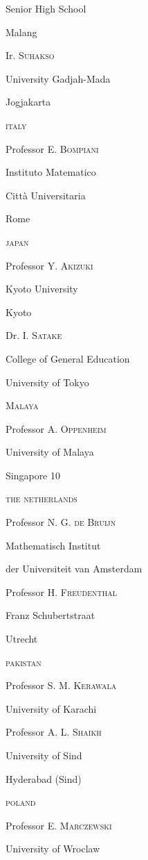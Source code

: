 \quad Senior High School

\quad Malang
\smallskip

\quad Ir. \textsc{Suhakso}

\quad University Gadjah-Mada

\quad Jogjakarta
\medskip

\noindent
\textsc{italy}

\quad Professor \textsc{E. Bompiani}

\quad Instituto Matematico

\quad Citt\`a Universitaria

\quad Rome
\medskip

\noindent
\textsc{japan}

\quad Professor \textsc{Y. Akizuki}

\quad Kyoto University

\quad Kyoto
\smallskip

\quad Dr. \textsc{I. Satake}\pageoriginale

\quad College of General Education

\quad University of Tokyo
\medskip

\noindent
\textsc{Malaya}

\quad Professor \textsc{A. Oppenheim}

\quad University of Malaya

\quad Singapore 10
\medskip

\noindent
\textsc{the netherlands}

\quad Professor \textsc{N. G. de Bruijn}

\quad Mathematisch Institut

\quad der Universiteit van Amsterdam
\smallskip

\quad Professor \textsc{H. Freudenthal}

 Franz Schubertstraat

\quad Utrecht
\medskip

\noindent
\textsc{pakistan}

\quad Professor \textsc{S. M. Kerawala}

\quad University of Karachi
\smallskip

\quad Professor \textsc{A. L. Shaikh}

\quad University of Sind

\quad Hyderabad (Sind)
\medskip

\noindent
\textsc{poland}

\quad Professor \textsc{E. Marczewski}

\quad University of Wroclaw
\medskip


